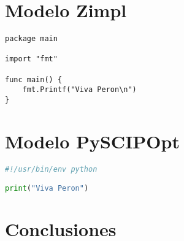 \documentclass[11pt, a4paper, pdftex]{article}
\begin{document}
\section*{Modelo Zimpl}

\begin{lstlisting}
package main

import "fmt"

func main() {
	fmt.Printf("Viva Peron\n")
}
\end{lstlisting}

\section*{Modelo PySCIPOpt}

\begin{lstlisting}[language=Python]
#!/usr/bin/env python

print("Viva Peron")
\end{lstlisting}



\section*{Conclusiones}
\end{document}
